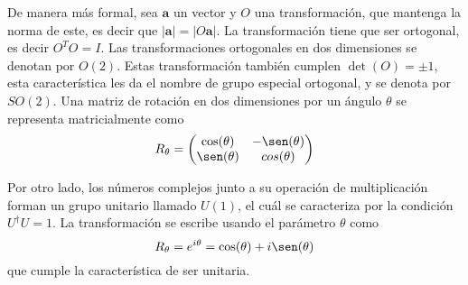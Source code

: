 De manera más formal, sea $\mathbf{a}$ un vector y $O$ una transformación, que mantenga la norma de este, es decir que $|\mathbf{a}| = |O\mathbf{a}|$. La transformación tiene que ser ortogonal, es decir $O^{T}O = I$. Las transformaciones ortogonales en dos dimensiones se denotan por $O(2)$. Estas transformación también cumplen $\det(O) = \pm 1$, esta característica les da el nombre de grupo especial ortogonal, y se denota por $SO(2)$. Una matriz de rotación en dos dimensiones por un ángulo $\theta$ se representa matricialmente como
\begin{equation*}
  R_\theta = \begin{pmatrix}
    \cos(\theta) & -\sen(\theta) \\
    \sen(\theta) & cos(\theta)
  \end{pmatrix}
\end{equation*}

Por otro lado, los números complejos junto a su operación de multiplicación forman un grupo unitario llamado $U(1)$, el cuál se caracteriza por la condición $U^\dagger U = 1$. La transformación se escribe usando el parámetro $\theta$ como
\begin{equation*}
  R_\theta = e^{i\theta} = \cos(\theta) + i\sen(\theta)
\end{equation*}
que cumple la característica de ser unitaria.

